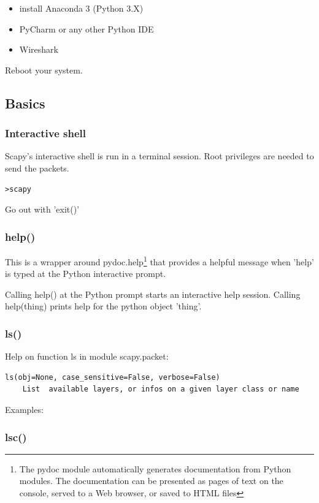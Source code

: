 \documentclass[11pt,a4paper]{article}
\begin{document}
\begin{itemize}
    \item install Anaconda 3 (Python 3.X)
    \item PyCharm or any other Python IDE
    \item Wireshark
\end{itemize}
Reboot your system.


\subsection{Basics}
\subsubsection{Interactive shell}
Scapy's interactive shell is run in a terminal session. Root privileges are needed to send the packets.

\begin{lstlisting}
>scapy 
\end{lstlisting}

Go out with 'exit()'

\subsubsection{help()}
This is a wrapper around pydoc.help\footnote{The pydoc module automatically generates documentation from Python modules. The documentation can be presented as pages of text on the console, served to a Web browser, or saved to HTML files} that provides a helpful message when 'help' is typed at the Python interactive prompt.

Calling help() at the Python prompt starts an interactive help session.
Calling help(thing) prints help for the python object 'thing'.

\subsubsection{ls()}
Help on function ls in module scapy.packet:
\begin{lstlisting}
ls(obj=None, case_sensitive=False, verbose=False)
    List  available layers, or infos on a given layer class or name
\end{lstlisting}
Examples:


\subsubsection{lsc()}
\end{document}

